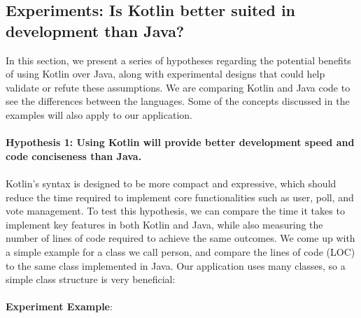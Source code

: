 \subsection{Experiments: Is Kotlin better suited in development than Java? }

In this section, we present a series of hypotheses regarding the potential benefits of using Kotlin over Java, along with experimental designs that could help validate or refute these assumptions. We are comparing Kotlin and Java code to see the differences between the languages. Some of the concepts discussed in the examples will also apply to our application. 
\\
\\
\textbf{Hypothesis 1: Using Kotlin will provide better development speed and code conciseness than Java.} 
\\
\\
Kotlin’s syntax is designed to be more compact and expressive, which should reduce the time required to implement core functionalities such as user, poll, and vote management. To test this hypothesis, we can compare the time it takes to implement key features in both Kotlin and Java, while also measuring the number of lines of code required to achieve the same outcomes. We come up with a simple example for a class we call person, and compare the lines of code (LOC) to the same class implemented in Java. Our application uses many classes, so a simple class structure is very beneficial:
\\
\\
\textbf{Experiment Example}:
